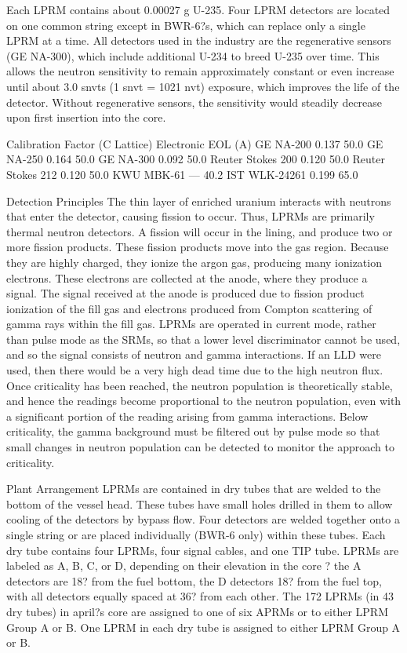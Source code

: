 \documentclass[10pt]{article}
\begin{document}
Each LPRM contains about 0.00027 g U-235. Four LPRM detectors are located on one common string except in BWR-6?s, which can replace only a single LPRM at a time. All detectors used in the industry are the regenerative sensors (GE NA-300), which include additional U-234 to breed U-235 over time. This allows the neutron sensitivity to remain approximately constant or even increase until about 3.0 snvts (1 snvt = 1021 nvt) exposure, which improves the life of the detector. Without regenerative sensors, the sensitivity would steadily decrease upon first insertion into the core. 


Calibration Factor (C Lattice)
Electronic EOL (A)
GE NA-200
0.137
50.0
GE NA-250
0.164
50.0
GE NA-300
0.092
50.0
Reuter Stokes 200
0.120
50.0
Reuter Stokes 212
0.120
50.0
KWU MBK-61
---
40.2
IST WLK-24261
0.199
65.0

Detection Principles
The thin layer of enriched uranium interacts with neutrons that enter the detector, causing fission to occur. Thus, LPRMs are primarily thermal neutron detectors. A fission will occur in the lining, and produce two or more fission products. These fission products move into the gas region. Because they are highly charged, they ionize the argon gas, producing many ionization electrons. These electrons are collected at the anode, where they produce a signal. The signal received at the anode is produced due to fission product ionization of the fill gas and electrons produced from Compton scattering of gamma rays within the fill gas. LPRMs are operated in current mode, rather than pulse mode as the SRMs, so that a lower level discriminator cannot be used, and so the signal consists of neutron and gamma interactions. If an LLD were used, then there would be a very high dead time due to the high neutron flux. Once criticality has been reached, the neutron population is theoretically stable, and hence the readings become proportional to the neutron population, even with a significant portion of the reading arising from gamma interactions. Below criticality, the gamma background must be filtered out by pulse mode so that small changes in neutron population can be detected to monitor the approach to criticality. 

Plant Arrangement
LPRMs are contained in dry tubes that are welded to the bottom of the vessel head. These tubes have small holes drilled in them to allow cooling of the detectors by bypass flow. Four detectors are welded together onto a single string or are placed individually (BWR-6 only) within these tubes. Each dry tube contains four LPRMs, four signal cables, and one TIP tube. LPRMs are labeled as A, B, C, or D, depending on their elevation in the core ? the A detectors are 18? from the fuel bottom, the D detectors 18? from the fuel top, with all detectors equally spaced at 36? from each other. The 172 LPRMs (in 43 dry tubes) in april?s core are assigned to one of six APRMs or to either LPRM Group A or B. One LPRM in each dry tube is assigned to either LPRM Group A or B. 
\end{document}
